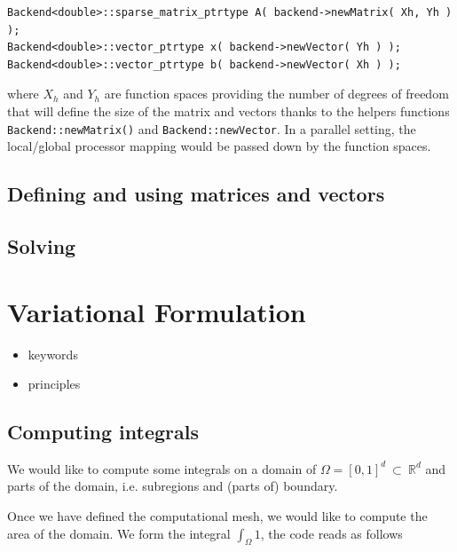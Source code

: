 \begin{lstlisting}
Backend<double>::sparse_matrix_ptrtype A( backend->newMatrix( Xh, Yh ) );
Backend<double>::vector_ptrtype x( backend->newVector( Yh ) );
Backend<double>::vector_ptrtype b( backend->newVector( Xh ) );
\end{lstlisting}
\noindent
where $X_h$ and $Y_h$ are function spaces providing the number of
degrees of freedom that will define the size of the matrix and vectors
thanks to the helpers functions \lstinline!Backend::newMatrix()! and
\lstinline!Backend::newVector!. In a parallel setting, the
local/global processor mapping would be passed down by the function
spaces.

\subsection{Defining and using matrices and vectors}
\label{sec:defin-using-matr}

\subsection{Solving}
\label{sec:solving}


\section{Variational Formulation}
\label{sec:vari-form}

\begin{itemize}
\item keywords
\item principles
\end{itemize}

\subsection{Computing integrals}
\label{sec:computing-integrals}

We would like to compute some integrals on a domain of $\Omega=[0,1]^d\ \subset\ \mathbb{R}^d$
and parts of the domain, i.e. subregions and (parts of) boundary.

Once we have defined the computational mesh, we would like to compute
the area of the domain. We form the integral $\int_\Omega 1$, the code
reads as follows



